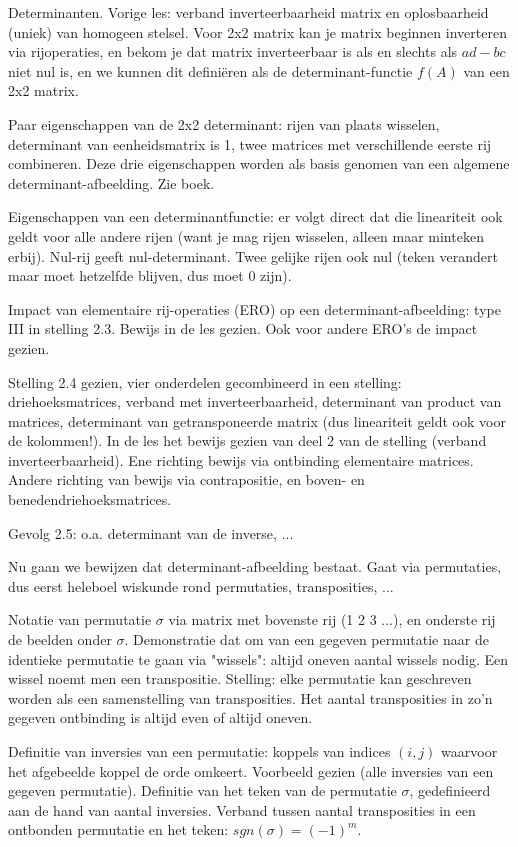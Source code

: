 \documentclass{article}
\begin{document}
Determinanten. Vorige les: verband inverteerbaarheid matrix en oplosbaarheid (uniek) van homogeen stelsel. Voor 2x2 matrix kan je matrix beginnen inverteren via rijoperaties, en bekom je dat matrix inverteerbaar is als en slechts als $ad-bc$ niet nul is, en we kunnen dit defini\"eren als de determinant-functie $f(A)$ van een 2x2 matrix. 

Paar eigenschappen van de 2x2 determinant: rijen van plaats wisselen, determinant van eenheidsmatrix is 1, twee matrices met verschillende eerste rij combineren. Deze drie eigenschappen worden als basis genomen van een algemene determinant-afbeelding. Zie boek. 

Eigenschappen van een determinantfunctie: er volgt direct dat die lineariteit ook geldt voor alle andere rijen (want je mag rijen wisselen, alleen maar minteken erbij). Nul-rij geeft nul-determinant. Twee gelijke rijen ook nul (teken verandert maar moet hetzelfde blijven, dus moet 0 zijn). 

Impact van elementaire rij-operaties (ERO) op een determinant-afbeelding: type III in stelling 2.3. Bewijs in de les gezien. Ook voor andere ERO's de impact gezien. 

Stelling 2.4 gezien, vier onderdelen gecombineerd in een stelling: driehoeksmatrices, verband met inverteerbaarheid, determinant van product van matrices, determinant van getransponeerde matrix (dus lineariteit geldt ook voor de kolommen!). In de les het bewijs gezien van deel 2 van de stelling (verband inverteerbaarheid). Ene richting bewijs via ontbinding elementaire matrices. Andere richting van bewijs via contrapositie, en boven- en benedendriehoeksmatrices. 

Gevolg 2.5: o.a. determinant van de inverse, ... 

Nu gaan we bewijzen dat determinant-afbeelding bestaat. Gaat via permutaties, dus eerst heleboel wiskunde rond permutaties, transposities, ... 

Notatie van permutatie $\sigma$ via matrix met bovenste rij (1 2 3 ...), en onderste rij de beelden onder $\sigma$. Demonstratie dat om van een gegeven  permutatie naar de identieke permutatie te gaan via "wissels": altijd oneven aantal wissels nodig. Een wissel noemt men een transpositie. Stelling: elke permutatie kan geschreven worden als een samenstelling van transposities. Het aantal transposities in zo'n gegeven ontbinding is altijd even of altijd oneven. 

Definitie van inversies van een permutatie: koppels van indices $(i,j)$ waarvoor het afgebeelde koppel de orde omkeert. Voorbeeld gezien (alle inversies van een gegeven permutatie).  Definitie van het teken van de permutatie $\sigma$, gedefinieerd aan de hand van aantal inversies. Verband tussen aantal transposities in een ontbonden permutatie en het teken: $sgn(\sigma)=(-1)^m$. 
\end{document}
